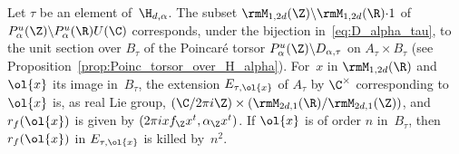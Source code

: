 \begin{Proposition}\label{prop_tors_prop_r_f_msv}
Let $\tau$ be an element of~$\H_{d,\alpha}$. The subset
$\rmM_{1,2d}(\Z)\backslash\rmM_{1,2d}(\R){\cdot}1$ of
$P_\alpha^u(\Z)\backslash P_\alpha^u(\R)U(\C)$ corresponds, under
the bijection in~\eqref{eq:D_alpha_tau}, to the unit section over
$B_\tau$ of the Poincaré torsor $P_\alpha^u(\Z)\backslash
D_{\alpha,\tau}$ on $A_\tau\times B_\tau$ (see
Proposition~\ref{prop:Poinc_torsor_over_H_alpha}).
For~$x$ in $\rmM_{1,2d}(\R)$ and
$\ol{x}$ its image in~$B_\tau$, the extension $E_{\tau,\ol{x}}$ of
$A_\tau$ by $\C^\times$ corresponding to~$\ol{x}$ is,
as real Lie group, $(\C/2\pi i\Z)\times(\rmM_{2d,1}(\R)/\rmM_{2d,1}(\Z))$,
and $r_f(\ol{x})$ is given by $(2\pi ixf_\Z x^t, \alpha_\Z x^t)$. If $\ol{x}$ is of
order $n$ in~$B_\tau$, then $r_f(\ol{x})$ in $E_{\tau,\ol{x}}$ is killed by~$n^2$.
\end{Proposition}
